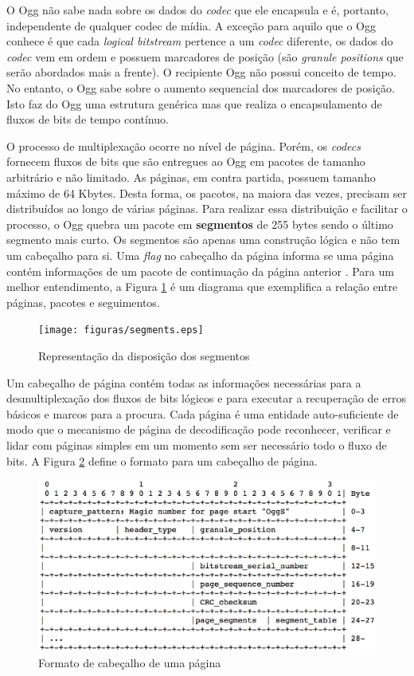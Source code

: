 O Ogg não sabe nada sobre os dados do \textit{codec} que ele encapsula e é, portanto, independente de qualquer codec de mídia. A exceção para aquilo que o Ogg conhece é que cada \textit{logical bitstream} pertence a um \textit{codec} diferente, os dados do \textit{codec} vem em ordem e possuem marcadores de posição (são \textit{granule positions} que serão abordados mais a frente). O recipiente Ogg não possui conceito de tempo. No entanto, o Ogg sabe sobre o aumento sequencial dos marcadores de posição. Isto faz do Ogg uma estrutura genérica mas que realiza o encapsulamento de fluxos de bits de tempo contínuo.

O processo de multiplexação ocorre no nível de página. Porém, os \textit{codecs} fornecem fluxos de bits que são entregues ao Ogg em pacotes de tamanho arbitrário e não limitado. As páginas, em contra partida, possuem tamanho máximo de 64 Kbytes. Desta forma, os pacotes, na maiora das vezes, precisam ser distribuídos ao longo de várias páginas. Para realizar essa distribuição e facilitar o processo, o Ogg quebra um pacote em \textbf{segmentos} de 255 bytes sendo o último segmento mais curto. Os segmentos são apenas uma construção lógica e não tem um cabeçalho para si. Uma \textit{flag} no cabeçalho da página informa se uma página contém informações de um pacote de continuação da página anterior \cite{ogg}. Para um melhor entendimento, a Figura \ref{segments} é um diagrama que exemplifica a relação entre páginas, pacotes e seguimentos.

\begin{figure}[ht]
	\centering
		\texttt{[image: figuras/segments.eps]}
	\caption{Representação da disposição dos segmentos \cite{ogg}}
	\label{segments}
\end{figure}

Um cabeçalho de página contém todas as informações necessárias para a desmultiplexação dos fluxos de bits lógicos e para executar a recuperação de erros básicos e marcos para a procura. Cada página é uma entidade auto-suficiente de modo que o mecanismo de página de decodificação pode reconhecer, verificar e lidar com páginas simples em um momento sem ser necessário todo o fluxo de bits. A Figura \ref{pageheader} define o formato para um cabeçalho de página.

\begin{figure}[ht]
	\centering
		\includegraphics[keepaspectratio=true,scale=0.6]{figuras/pageheader.eps}
	\caption{Formato de cabeçalho de uma página \cite{ogg}}
	\label{pageheader}
\end{figure}

